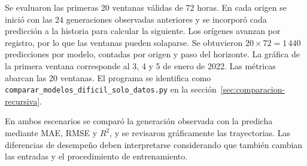 Se evaluaron las primeras 20 ventanas válidas de 72 horas. En cada origen se inició con las 24 generaciones observadas anteriores y se incorporó cada predicción a la historia para calcular la siguiente. Los orígenes avanzan por registro, por lo que las ventanas pueden solaparse. Se obtuvieron \(20\times72=1\,440\) predicciones por modelo, contadas por origen y paso del horizonte. La gráfica de la primera ventana corresponde al 3, 4 y 5 de enero de 2022. Las métricas abarcan las 20 ventanas. El programa se identifica como \texttt{comparar\_modelos\_dificil\_solo\_datos.py} en la sección~\ref{sec:comparacion-recursiva}.

En ambos escenarios se comparó la generación observada con la predicha mediante MAE, RMSE y \(R^2\), y se revisaron gráficamente las trayectorias. Las diferencias de desempeño deben interpretarse considerando que también cambian las entradas y el procedimiento de entrenamiento.


